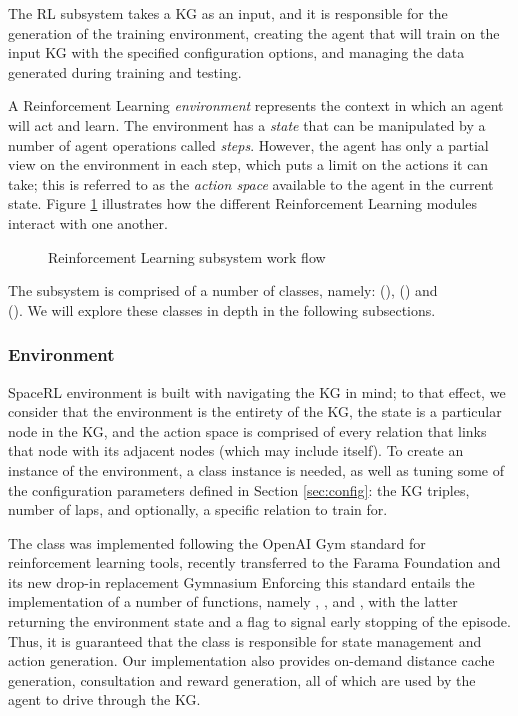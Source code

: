 The RL subsystem takes a KG as an input, and it is responsible for the generation of the training environment, creating the agent that will train on the input KG with the specified configuration options, and managing the data generated during training and testing. 

A Reinforcement Learning \emph{environment} represents the context in which an agent will act and learn. The environment has a \emph{state} that can be manipulated by a number of agent operations called \emph{steps}. However, the agent has only a partial view on the environment in each step,  which puts a limit on the actions it can take; this is referred to as the \emph{action space} available to the agent in the current state. Figure \ref{fig:rl_flow} illustrates how the different Reinforcement Learning modules interact with one another.


\begin{figure}[!h]
    \centering
    
    \caption{Reinforcement Learning subsystem work flow}
    \label{fig:rl_flow}
\end{figure}

The subsystem is comprised of a number of classes, namely:   (),  () and  \\(). We will explore these classes in depth in the following subsections.

\subsubsection{Environment}

SpaceRL environment is built with navigating the KG in mind; to that effect, we consider that the environment is the entirety of the KG, the state is a particular node in the KG, and the action space is comprised of every relation that links that node with its adjacent nodes (which may include itself).
To create an instance of the environment, a  class instance is needed, as well as tuning some of the configuration parameters defined in Section \ref{sec:config}: the KG triples, number of laps, and optionally, a specific relation to train for.

The  class was implemented following the OpenAI Gym 
standard for reinforcement learning tools, recently transferred to the Farama Foundation and its new drop-in replacement Gymnasium
Enforcing this standard entails the implementation of a number of functions, namely , ,  and , with the latter returning the environment state and a  flag to signal early stopping of the episode. Thus, it is guaranteed that the  class is responsible for state management and action generation. Our implementation also provides on-demand distance cache generation, consultation and reward generation, all of which are used by the agent to drive through the KG.


